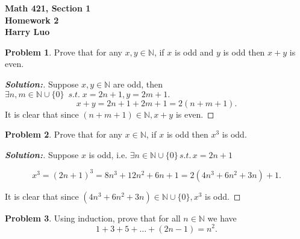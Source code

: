 \documentclass[12pt]{article}
\theoremstyle{definition}\newtheorem{problem}{Problem}
\newenvironment{solution}{\begin{proof}[\bfseries\textup{Solution:}]}{\end{proof}}
\begin{document}

\begin{center}
\bfseries Math 421, Section 1 
\\ 
Homework 2
\\ 
Harry Luo %
\\ [24pt] 
\end{center}

\begin{problem}
Prove that for any $x,y\in\mathbb{N}$, if $x$ is odd and $y$ is odd then $x+y$ is even.
\end{problem}


\begin{solution} 
    Suppose $ x, y \in \mathbb{N} $ are odd, then $ \exists n, m \in \mathbb{N} \cup \{0\} \ \; s.t. \; x = 2n+1, y = 2m+1. $ 
    \begin{equation}
         x+y = 2 n + 1 + 2 m + 1 = 2(n + m + 1). 
    \end{equation}  
    It is clear that since $ (n + m + 1) \in \mathbb{N}, x+y $ is even.  
\end{solution}

\newpage
\begin{problem}
Prove that for any $x\in\mathbb{N}$, if $x$ is odd then $x^3$ is odd.
\end{problem}

\begin{solution}


Suppose $ x  $ is odd, i.e. $ \exists n \in \mathbb{N} \cup \{0\} \, s.t.\, x=2n+1$ 

\begin{equation} x^3 = (2n+1)^3 = 8n^3 + 12n^2 + 6n + 1 = 2(4n^3 + 6n^2 + 3n) + 1. \end{equation} 

    It is clear that since $ (4n^3 + 6n^2 + 3n) \in \mathbb{N} \cup \{0\}, x^3 $ is odd.

\end{solution} 



\newpage
\begin{problem}
Using induction, prove that for all $n\in\mathbb{N}$ we have
\begin{equation*}
1+3+5+\dots+(2n-1) = n^2 .
\end{equation*}
\end{problem}
\end{document}
